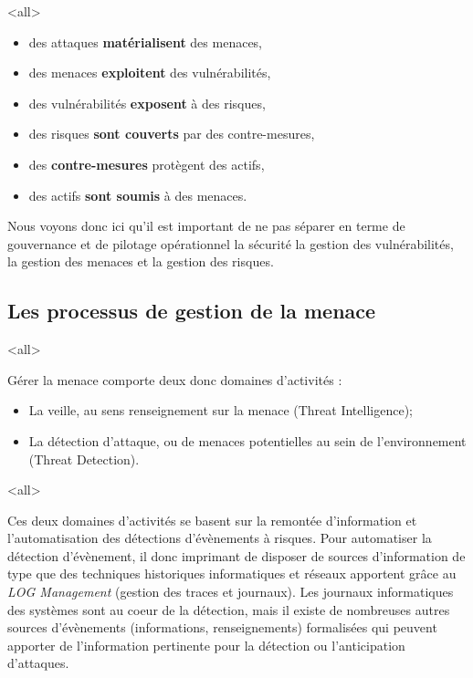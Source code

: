 
\mode<all>{}

\begin{itemize}
  \item des attaques \textbf{matérialisent} des menaces,
  \item des menaces \textbf{exploitent} des vulnérabilités,
  \item des vulnérabilités \textbf{exposent} à des risques,
  \item des risques\textbf{ sont couverts }par des contre-mesures,
  \item des \textbf{contre-mesures }protègent des actifs,
  \item des actifs \textbf{sont  soumis }à  des menaces.
\end{itemize}

Nous voyons donc ici qu'il est important de ne pas séparer en terme de gouvernance et de pilotage opérationnel la sécurité la gestion des vulnérabilités, la gestion des menaces et la gestion des risques.




\subsection{Les processus de gestion de la menace}

\mode<all>{
{
Gérer la menace comporte deux donc domaines d'activités :
\begin{itemize}
  \item La veille, au sens renseignement sur la menace (Threat Intelligence);
  \item La détection d'attaque, ou de menaces potentielles au sein de l'environnement (Threat Detection).
\end{itemize}
}}%

\mode<all>{}

Ces deux domaines d'activités se basent sur la remontée d'information et l'automatisation des détections d'évènements à risques.  Pour automatiser la détection d'évènement, il donc imprimant de disposer de sources d'information de type  que des techniques historiques informatiques et réseaux  apportent grâce au \textit{LOG  Management} (gestion des traces et journaux). Les journaux informatiques des systèmes sont au coeur de la détection, mais il existe de nombreuses autres sources d'évènements (informations,  renseignements) formalisées qui peuvent apporter de l'information pertinente pour la détection ou l'anticipation d'attaques.

